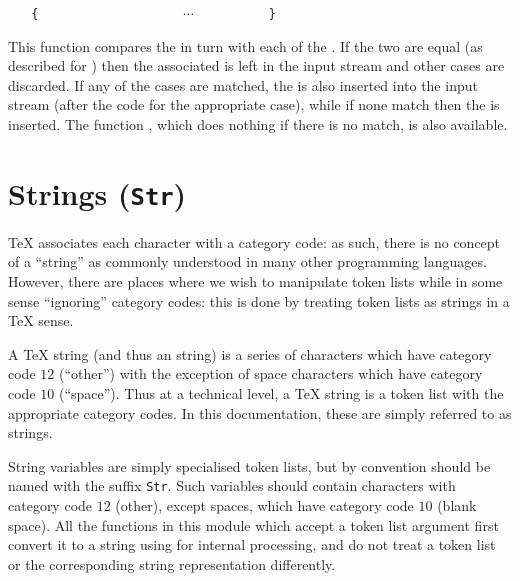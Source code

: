\documentclass[oneside]{book}
\begin{document}
\begin{function}{\TlVarCaseTF}
\begin{syntax}
 
~ ~ \verb"{"
~ ~ ~ ~  
~ ~ ~ ~  
~ ~ ~ ~ $\cdots$
~ ~ ~ ~  
~ ~ \verb"}"
~ ~ 
~ ~ 
\end{syntax}
This function compares the  in turn
with each of the . If the two
are equal (as described for )
then the associated  is left in the input
stream and other cases are discarded. If any of the
cases are matched, the  is also inserted into the
input stream (after the code for the appropriate case), while if none
match then the  is inserted. The function ,
which does nothing if there is no match, is also available.
\begin{demohigh}
\IgnoreSpacesOn
\TlSet {}
\TlSet {}
\TlSet {}
\TlSet {}
\TlVarCaseTF {}
\IgnoreSpacesOff
\end{demohigh}
\end{function}

\chapter{Strings (\texttt{Str})}

\TeX{} associates each character with a category code: as such, there is no
concept of a \enquote{string} as commonly understood in many other
programming languages. However, there are places where we wish to manipulate
token lists while in some sense \enquote{ignoring} category codes: this is
done by treating token lists as strings in a \TeX{} sense.

A \TeX{} string (and thus an  string) is a series of characters
which have category code $12$ (\enquote{other}) with the exception of
space characters which have category code $10$ (\enquote{space}). Thus
at a technical level, a \TeX{} string is a token list with the appropriate
category codes. In this documentation, these are simply referred to as
strings.

String variables are simply specialised token lists, but by convention
should be named with the suffix \texttt{Str}.  Such variables
should contain characters with category code $12$ (other), except
spaces, which have category code $10$ (blank space).  All the
functions in this module which accept a token list argument first
convert it to a string using  for internal processing,
and do not treat a token list or the corresponding string
representation differently.
\end{document}

